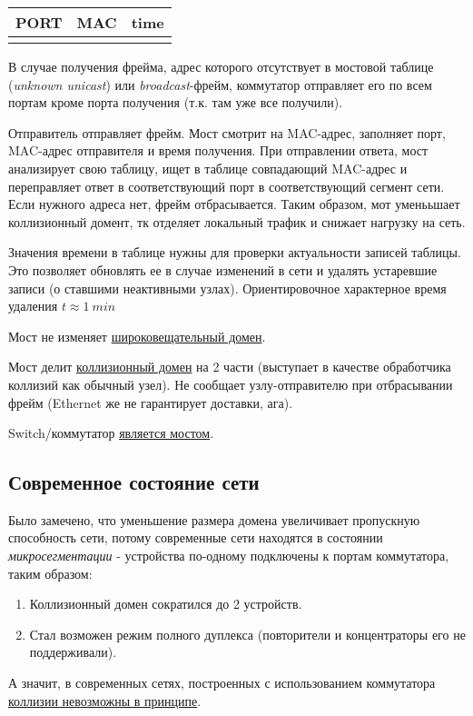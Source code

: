\documentclass[a4paper,10pt]{article}
\begin{document}
	
	\begin{tabular}[h]{|c|c|c|}
		\hline 
		PORT & MAC & time \\ 
		\hline 
		&  &  \\ 
		\hline 
	\end{tabular} 
	
	В случае получения фрейма, адрес которого отсутствует в мостовой таблице (\emph{unknown unicast}) или \emph{broadcast}-фрейм, коммутатор отправляет его по всем портам кроме порта получения (т.к. там уже все получили).
	
	Отправитель отправляет фрейм. Мост смотрит на MAC-адрес, заполняет порт, MAC-адрес отправителя и время получения. При отправлении ответа, мост анализирует свою таблицу, ищет в таблице совпадающий MAC-адрес и переправляет ответ в соответствующий порт в соответствующий сегмент сети. Если нужного адреса нет, фрейм отбрасывается. Таким образом, мот уменььшает коллизионный домент, тк отделяет локальный трафик и снижает нагрузку на сеть.
	
	Значения времени в таблице нужны для проверки актуальности записей таблицы. Это позволяет обновлять ее в случае изменений в сети и удалять устаревшие записи (о ставшими неактивными узлах). Ориентировочное характерное время удаления $ t\approx1\ min $
	
	Мост не изменяет \underline{широковещательный домен}.
	
	Мост делит \underline{коллизионный домен} на 2 части (выступает в качестве обработчика коллизий как обычный узел). Не сообщает узлу-отправителю при отбрасывании фрейм (Ethernet же не гарантирует доставки, ага).
	
	Switch/коммутатор \underline{является мостом}.
	
	\newpage
	
	\subsection{Современное состояние сети}
	Было замечено, что уменьшение размера домена увеличивает пропускную способность сети, потому современные сети находятся в состоянии \emph{микросегментации} - устройства по-одному подключены к портам коммутатора, таким образом:
	
	\begin{enumerate}
		\item Коллизионный домен сократился до 2 устройств.
		\item Стал возможен режим полного дуплекса (повторители и концентраторы его не поддерживали).
	\end{enumerate}
	А значит, в современных сетях, построенных с использованием коммутатора \underline{коллизии невозможны в принципе}.
	
\end{document}
